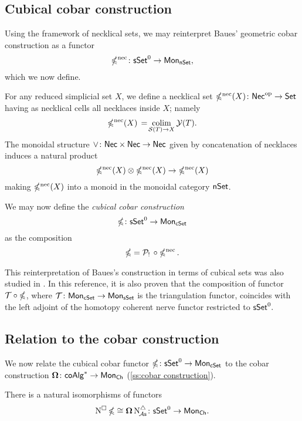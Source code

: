 \subsection{Cubical cobar construction}\label{ss:cubical cobar}

Using the framework of necklical sets, we may reinterpret Baues' geometric cobar construction \cite{baues1980geometry} as a functor
\[
\operatorname{\mathbb{\Omega}^{\mathrm{nec}}} \colon \mathsf{sSet}^0 \to \mathsf{Mon}_{\mathsf{nSet}},
\]
which we now define.

For any reduced simplicial set $X$, we define a necklical set $\operatorname{\mathbb{\Omega}^{\mathrm{nec}}}(X) \colon \mathsf{Nec}^{\mathrm{op}} \to \mathsf{Set}$ having as necklical cells all necklaces inside $X$; namely
\[
\operatorname{\mathbb{\Omega}^{\mathrm{nec}}}(X) \, = \! \operatorname*{colim}_{\mathcal{S}(T) \to X} \mathcal{Y}(T).
\]
The monoidal structure $\vee \colon \mathsf{Nec} \times \mathsf{Nec} \to \mathsf{Nec}$ given by concatenation of necklaces induces a natural product
\[
\operatorname{\mathbb{\Omega}^{\mathrm{nec}}}(X) \otimes \operatorname{\mathbb{\Omega}^{\mathrm{nec}}}(X) \to \operatorname{\mathbb{\Omega}^{\mathrm{nec}}}(X)
\]
making $\operatorname{\mathbb{\Omega}^{\mathrm{nec}}}(X)$ into a monoid in the monoidal category $\mathsf{nSet}$.

We may now define the \textit{cubical cobar construction}
\[
\operatorname{\mathbb{\Omega}} \colon \mathsf{sSet}^0 \to \mathsf{Mon}_{\mathsf{cSet}}
\]
as the composition
\[
\operatorname{\mathbb{\Omega}} = \mathcal{P}_! \, \circ \operatorname{\mathbb{\Omega}^{\mathrm{nec}}}.
\]

\begin{remark}
	This reinterpretation of Baues's construction in terms of cubical sets was also studied in \cite{rivera2018cubical}. In this reference, it is also proven that the composition of functor $\mathcal{T} \circ \operatorname{\mathbb{\Omega}}$, where $\mathcal{T} \colon \mathsf{Mon}_{\mathsf{cSet}} \to \mathsf{Mon}_{\mathsf{sSet}}$ is the triangulation functor, coincides with the left adjoint of the homotopy coherent nerve functor restricted to $\mathsf{sSet}^0.$
\end{remark}

\subsection{Relation to the cobar construction}

We now relate the cubical cobar functor $\operatorname{\mathbb{\Omega}} \colon \mathsf{sSet}^0 \to \mathsf{Mon}_{\mathsf{cSet}}$ to the cobar construction $\operatorname{\mathbf{\Omega}} \colon \mathsf{coAlg}^\ast \to \mathsf{Mon}_{\mathsf{Ch}}$ (\cref{ss:cobar construction}).

\begin{theorem}\label{t:ccobar and cobar}
	There is a natural isomorphisms of functors
	\[
	\operatorname{N^{\square}} \operatorname{\mathbb{\Omega}} \cong \operatorname{\mathbf{\Omega}} \operatorname{N^{\triangle}_{\!{\mathcal{A}\mathsf{s}}}} \colon \mathsf{sSet}^0 \to \mathsf{Mon}_{\mathsf{Ch}}.
	\]
\end{theorem}

